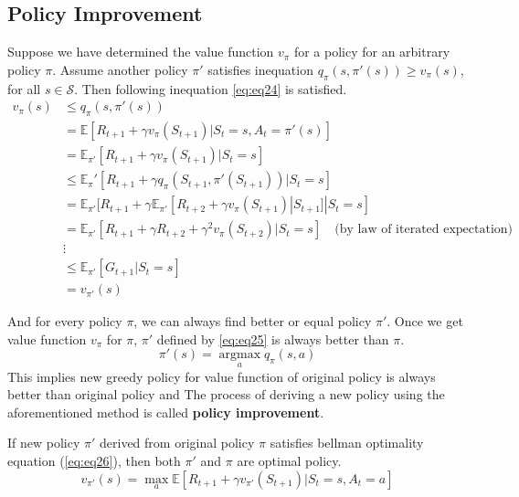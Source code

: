 \documentclass[
	10pt, %
]{article}
\newcommand{\mbb}[1]{\mathbb{#1}}
\newcommand{\mc}[1]{\mathcal{#1}}
\newcommand{\tb}[1]{\textbf{#1}}
\numberwithin{equation}{subsection} %
\newcommand{\argmax}{\mathop{\mathrm{argmax}}\limits}
\begin{document}
\subsection{Policy Improvement}
Suppose we have determined the value function $v_\pi$ for a policy for an arbitrary policy $\pi$. Assume another policy $\pi'$ satisfies inequation $q_\pi(s, \pi'(s)) \geq v_\pi(s)$, for all $s \in \mc{S}$. Then following inequation \cref{eq:eq24} is satisfied.
\begin{equation} \label{eq:eq24}
    \begin{aligned}
        v_\pi(s) &\leq q_\pi(s, \pi'(s))\\
        &=\mbb{E}[R_{t+1} + \gamma v_\pi(S_{t+1}) | S_t=s, A_t=\pi'(s)]\\
        &=\mbb{E}_{\pi'}[R_{t+1} + \gamma v_\pi (S_{t+1}) | S_{t}=s]\\
        &\leq \mbb{E}_\pi'[R_{t+1} + \gamma q_\pi(S_{t+1}, \pi'(S_{t+1}))|S_t=s]\\
        &= \mbb{E}_{\pi'}[R_{t+1} + \gamma\mbb{E}_{\pi'}[R_{t+2} + \gamma v_\pi(S_{t+1})|S_{t+1}]|S_t=s]\\
        &= \mbb{E}_{\pi'}[R_{t+1}+\gamma R_{t+2} + \gamma^2 v_\pi (S_{t+2}) |S_t=s] \quad \text{(by law of iterated expectation)}\\
        &\vdots\\
        &\leq \mbb{E}_{\pi'}[G_{t+1}|S_t=s]\\
        &= v_{\pi'}(s)
    \end{aligned}
\end{equation}

And for every policy $\pi$, we can always find better or equal policy $\pi'$. Once we get value function $v_\pi$ for $\pi$, $\pi'$ defined by \cref{eq:eq25} is always better than $\pi$.
\begin{equation} \label{eq:eq25}
    \pi'(s) = \argmax_a q_\pi(s,a)
\end{equation}
This implies new greedy policy for value function of original policy is always better than original policy and The process of deriving a new policy using the aforementioned method is called \tb{policy improvement}.

If new policy $\pi'$ derived from original policy $\pi$ satisfies bellman optimality equation (\cref{eq:eq26}), then both $\pi'$ and $\pi$ are optimal policy.
\begin{equation} \label{eq:eq26}
    v_{\pi'}(s) = \max_a \mbb{E}[R_{t+1} + \gamma v_{\pi'}(S_{t+1}) | S_t=s, A_t=a]
\end{equation}
\end{document}
